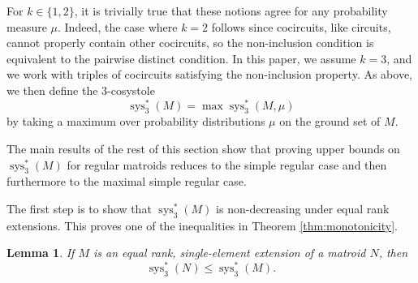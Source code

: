 \documentclass[reqno,12pt]{amsart}
\newtheorem{lemma}[theorem]{Lemma}
\numberwithin{theorem}{section}
\theoremstyle{plain}
\theoremstyle{definition}
\theoremstyle{remark}
\numberwithin{equation}{section}
\numberwithin{table}{section}
\DeclareMathOperator{\sys}{sys}
\begin{document}
For $k\in \{1,2\}$, it is trivially true that these notions agree for any probability measure $\mu$. Indeed, the case where $k = 2$ follows since cocircuits, like circuits, cannot properly contain other cocircuits, so the non-inclusion condition is equivalent to the pairwise distinct condition. In this paper, we assume $k = 3$, and we work with triples of cocircuits satisfying the non-inclusion property. 
As above, we then define the $3$-cosystole
    \[\sys_3^*(M) = \max \sys_3^*(M, \mu)\]
by taking a maximum over probability distributions $\mu$ on the ground set of $M$. 


The main results of the rest of this section show that proving upper bounds on $\sys_3^*(M)$ for regular matroids reduces to the simple regular case and then furthermore to the maximal simple regular case.

The first step is to show that $\sys_3^*(M)$ is non-decreasing under equal rank extensions. This proves one of the inequalities in Theorem \ref{thm:monotonicity}.

\begin{lemma}\label{lem:monoton del}
If $M$ is an equal rank, single-element extension of a matroid $N$, then 
    \[\sys_3^*(N)\leq \sys_3^*(M).\]
\end{lemma}
\end{document}
